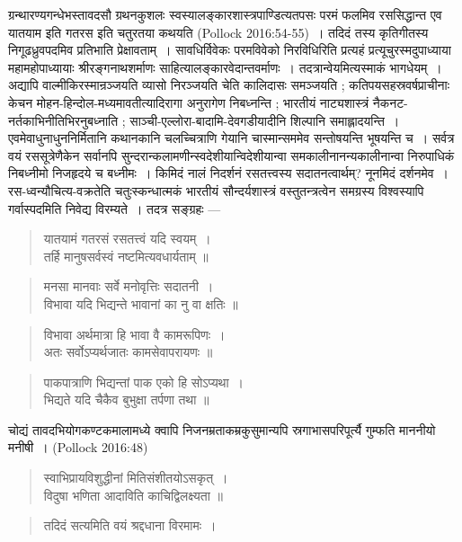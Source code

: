{\dev ग्रन्थारण्यगन्धेभस्तावदसौ ग्रथनकुशलः स्वस्यालङ्कारशास्त्रपाण्डित्यतपसः परमं फलमिव रससिद्धान्त एव यातयाम इति गतरस इति चतुरतया कथयति} (Pollock 2016:54-55){\dev~। तदिदं तस्य कृतिगीतस्य निगूढध्रुवपदमिव प्रतिभाति प्रेक्षावताम्~। सावधिर्विवेकः परमविवेको निरविधिरिति प्रत्यहं प्रत्यूचुरस्मदुपाध्याया महामहोपाध्यायाः श्रीरङ्गनाथशर्माणः साहित्या\-लङ्कारवेदान्तवर्माणः~। तदत्रान्वेयमित्यस्माकं भागधेयम्~। अद्यापि वाल्मीकिरस्मान्रञ्जयति व्यासो निरञ्जयति चेति कालिदासः समञ्जयति ; कतिपयसहस्रवर्षप्राचीनाः केचन मोहन-हिन्दोल-मध्यमावतीत्यादिरागा अनुरागेण निबध्नन्ति ; भारतीयं नाट्यशास्त्रं नैकनट-नर्त\-काभिनीतिभिरनुबध्नाति ; साञ्ची-एल्लोरा-बादामि-देवगडीयादीनि शिल्पानि समाह्लादयन्ति~। एव\-मेवाधुनाधुननिर्मितानि कथानकानि चलच्चित्राणि गेयानि चास्मान्सममेव सन्तोषयन्ति भूष\-यन्ति च~। सर्वत्र वयं रससूत्रेणैकेन सर्वानपि सुन्दरान्कलामणीन्स्वदेशीयान्विदेशीयान्वा समकालीनानन्यकालीनान्वा निरुपाधिकं निबध्नीमो निजहृदये च बध्नीमः~। किमिदं नालं निदर्शनं रसतत्त्वस्य सदातनत्वार्थम्? नूनमिदं दर्शनमेव~। रस-ध्वन्यौचित्य-वक्रतेति चतुः\-स्कन्धात्मकं भारतीयं सौन्दर्यशास्त्रं वस्तुतन्त्रत्वेन समग्रस्य विश्वस्यापि गर्वास्पदमिति निवेद्य विरम्यते~। तदत्र सङ्ग्रहः ---}
\begin{quote}
{\dev यातयामं गतरसं रसतत्त्वं यदि स्वयम्~।}\\
{\dev तर्हि मानुषसर्वस्वं नष्टमित्यवधार्यताम् ॥}
\end{quote}
\begin{quote}
{\dev मनसा मानवाः सर्वे मनोवृत्तिः सदातनी~।}\\
{\dev विभावा यदि भिद्यन्ते भावानां का नु वा क्षतिः ॥}
\end{quote}
\begin{quote}
{\dev विभावा अर्थमात्रा हि भावा वै कामरूपिणः~।}\\
{\dev अतः सर्वोऽप्यर्थजातः कामसेवापरायणः ॥}
\end{quote}
\begin{quote}
{\dev पाकपात्राणि भिद्यन्तां पाक एको हि सोऽप्यथा~।}\\
{\dev भिद्यते यदि चैकैव बुभुक्षा तर्पणा तथा ॥}
\end{quote}

{\dev चोद्यं तावदभियोगकण्टकमालामध्ये क्वापि निजनम्रताकम्रकुसुमान्यपि स्रगाभासपरिपूर्त्यै गुम्फति माननीयो मनीषी~।} (Pollock 2016:48)   
\begin{quote}
{\dev स्वाभिप्रायविशुद्धीनां मितिसंशीतयोऽसकृत्~।}\\
{\dev विदुषा भणिता आदाविति काचिद्विलक्ष्यता ॥}
\end{quote}
\begin{quote}
{\dev तदिदं सत्यमिति वयं श्रद्दधाना विरमामः~।}
\end{quote}

